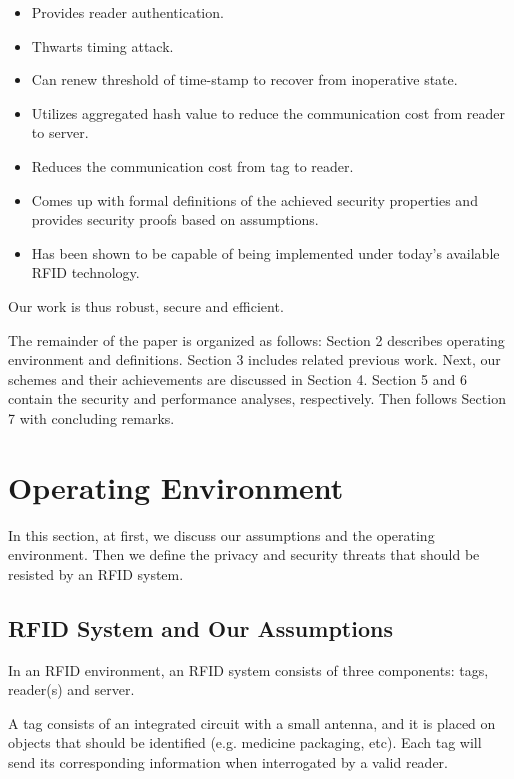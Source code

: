 \documentclass{easychair}
\begin{document}
\begin{itemize}
\item Provides reader authentication.

\item Thwarts timing attack.

\item Can renew threshold  of time-stamp to recover from inoperative state.

\item Utilizes aggregated hash value  to reduce the communication cost from reader to server.

\item Reduces the communication cost from tag to reader.

\item Comes up with formal definitions of the achieved security properties and provides security proofs based on assumptions.

\item Has been shown to be capable of being implemented under today's available RFID technology.
\end{itemize}
Our work is thus robust, secure and efficient. 

 The remainder of the paper is organized as 
follows: Section
2 describes operating environment and definitions. Section 3 includes related previous work. Next, our schemes and their achievements are discussed in Section 4.
Section 5 and 6 contain the security and performance analyses, respectively. Then follows Section 7 with concluding remarks.



\section{Operating Environment}
In this section, at first, we discuss our assumptions and the operating 
environment. Then we define the privacy and security threats that should be 
resisted by an RFID system. 

\subsection{RFID System and Our Assumptions}
In an RFID environment, an RFID system consists of three
components: tags, reader(s) and server.

A tag consists of an integrated circuit with a small antenna,
and it is placed on objects that should be identified (e.g. medicine packaging, etc). Each tag will send its
 corresponding information
when interrogated by a valid reader.
\end{document}
